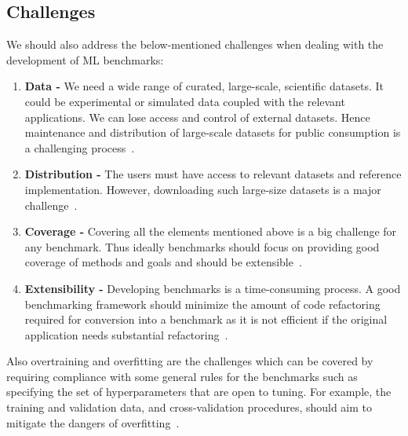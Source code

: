 \documentclass[a4paper,UKenglish,cleveref, autoref, thm-restate]{lipics-v2021}
\begin{document}
\subsection{Challenges}
\label{Challenges}
We should also address the below-mentioned challenges when dealing with the development of ML benchmarks:
\begin{enumerate}

\item \textbf{Data -} 
We need a wide range of curated, large-scale, scientific datasets. It could be experimental or simulated data coupled with the relevant applications. We can lose access and control of external datasets. Hence maintenance and distribution of large-scale datasets for public consumption is a challenging process~\cite{sctmlb}.

\item \textbf{Distribution - }
The users must have access to relevant datasets and reference implementation. However, downloading such large-size datasets
is a major challenge~\cite{sctmlb}.

\item \textbf{Coverage -}  
Covering all the elements mentioned above is a big challenge for any benchmark. Thus ideally benchmarks should focus on providing good coverage of methods and goals and should be extensible~\cite{sctmlb}.

 \item \textbf{Extensibility -} 
 Developing benchmarks is a time-consuming process. A good benchmarking framework should minimize the amount of code refactoring required for conversion into a benchmark as it is not efficient if the original application needs substantial refactoring~\cite{sctmlb}.
 
\end{enumerate}

Also overtraining and overfitting are the challenges which can be covered by requiring compliance with some general rules for the benchmarks such as specifying the set of hyperparameters that are open to tuning.
For example, the training and validation data, and cross-validation procedures, should aim to mitigate the dangers of overfitting~\cite{sctmlb}.
\end{document}
